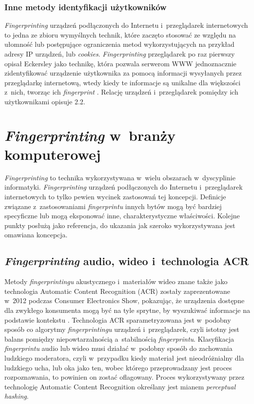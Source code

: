 \subsubsection{Inne metody identyfikacji użytkowników}
\emph{Fingerprinting} urządzeń podłączonych do Internetu i~przeglądarek
internetowych to jedna ze zbioru wymyślnych technik, które zaczęto stosować ze
względu na ułomność lub postępujące ograniczenia metod wykorzystujących na
przykład adresy IP urządzeń, lub \emph{cookies}. \emph{Fingerprinting}
przeglądarek po raz pierwszy opisał Eckersley jako technikę, która pozwala
serwerom WWW jednoznacznie zidentyfikować urządzenie użytkownika za pomocą
informacji wysyłanych przez przeglądarkę internetową, wtedy kiedy te informacje
są unikalne dla większości z~nich, tworząc ich \emph{fingerprint}
\cite{eckersley2010unique}. Relację urządzeń i~przeglądarek pomiędzy ich
użytkownikami opisuje 2.2.

\section{\emph{Fingerprinting} w~branży komputerowej}
\emph{Fingerprinting} to technika wykorzystywana w~wielu obszarach w~dyscyplinie
informatyki. \emph{Fingerprinting} urządzeń podłączonych do Internetu
i~przeglądarek internetowych to tylko pewien wycinek zastosowań tej koncepcji.
Definicje związane z~zastosowaniami \emph{fingerprintu} innych bytów mogą być
bardziej specyficzne lub mogą eksponować inne, charakterystyczne właściwości.
Kolejne punkty posłużą jako referencja, do ukazania jak szeroko wykorzystywana
jest omawiana koncepcja.

\subsection{\emph{Fingerprinting} audio, wideo i~technologia ACR}
Metody \emph{fingerprintingu} akustycznego i~materiałów wideo znane także jako
technologia Automatic Content Recognition (ACR) zostały zaprezentowane w~2012
podczas Consumer Electronics Show, pokazując, że urządzenia dostępne dla
zwykłego konsumenta mogą być na tyle sprytne, by wyszukiwać informacje na
podstawie kontekstu \cite{ng2012brief}. Technologia ACR sparametryzowana jest
w~podobny sposób co algorytmy \emph{fingerprintingu} urządzeń i~przeglądarek,
czyli istotny jest balans pomiędzy niepowtarzalnością a~stabilnością
\emph{fingerprintu}. Klasyfikacja \emph{fingerprintu} audio lub wideo musi
działać w~podobny sposób do zachowania ludzkiego moderatora, czyli w~przypadku
kiedy materiał jest nieodróżnialny dla ludzkiego ucha, lub oka jako ten, wobec
którego przeprowadzany jest proces rozpoznawania, to powinien on zostać
oflagowany. Proces wykorzystywany przez technologię Automatic Content
Recognition określany jest mianem \emph{perceptual hashing}.

